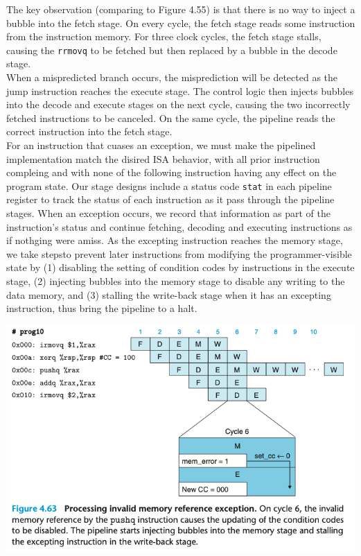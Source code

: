 \documentclass[11pt]{article}
\begin{document}
\begin{enumerate}
The key observation (comparing to Figure 4.55) is that there is no way to inject a bubble into the fetch stage. On every cycle, the fetch stage reads some instruction from the instruction memory. For three clock cycles, the fetch stage stalls, causing the \texttt{rrmovq} to be fetched but then replaced by a bubble in the decode stage.\\

When a mispredicted branch occurs, the misprediction will be detected as the jump instruction reaches the execute stage. The control logic then injects bubbles into the decode and execute stages on the next cycle, causing the two incorrectly fetched instructions to be canceled. On the same cycle, the pipeline reads the correct instruction into the fetch stage.\\

For an instruction that cuases an exception, we must make the pipelined implementation match the disired ISA behavior, with all prior instruction compleing and with none of the following instruction having any effect on the program state. Our stage designs include a status code \texttt{stat} in each pipeline register to track the status of each instruction as it pass through the pipeline stages. When an exception occurs, we record that information as part of the instruction's status and continue fetching, decoding and executing instructions as if nothging were amiss. As the excepting instruction reaches the memory stage, we take stepsto prevent later instructions from modifying the programmer-visible state by (1) disabling the setting of condition codes by instructions in the execute stage, (2) injecting bubbles into the memory stage to disable any writing to the data memory, and (3) stalling the write-back stage when it has an excepting instruction, thus bring the pipeline to a halt.\\

\begin{center}
\includegraphics[width=.9\linewidth]{pics/figure4.63-processing-invalid-memory-reference-exception.png}
\end{center}



\end{enumerate}
\end{document}
